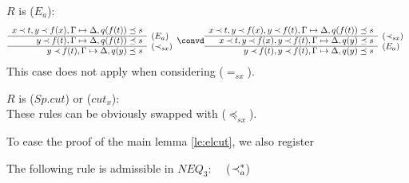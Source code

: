 \begin{PROOF}
\begin{LS}
%
\item $R$ is ($E_a$):
\[ \begin{array}{rl}
 x\Incl t, y\Incl f(x),  \GSD, q(f(t))\preceq s \\ \cline{1-1}
 y\Incl f(t),  \GSD, q(f(t))\preceq s & \rabove{(E_a)} \\ \cline{1-1}
 y\Incl f(t),  \GSD, q(y)\preceq s & \rabove{(\Incl_{sx})} \end{array} \convd
 \begin{array}{rl}
 x\Incl t, y\Incl f(x), y\Incl f(t), \GSD, q(f(t))\preceq s \\ \cline{1-1}
 x\Incl t, y\Incl f(x), y\Incl f(t), \GSD, q(y)\preceq s & \rabove{(\Incl_{sx})} \\ \cline{1-1}
 y\Incl f(t),  y\Incl f(t), \GSD, q(y)\preceq s & \rabove{(E_a)} \end{array}
 \]
This case does not apply when considering ($=_{sx}$).
%
\item $R$ is ($Sp.cut$) or ($cut_x$):\\
These rules can be obviously swapped with ($\preceq_{sx}$).
\end{LS}
\end{PROOF}
\noindent
To ease the proof of the main lemma \ref{le:elcut}, we also register
%
\begin{LEMMA}\label{le:inclaad} The following rule is admissible in $NEQ_3$:
\ \ ($\mathbin{\prec}_a^*$)
\end{LEMMA}
